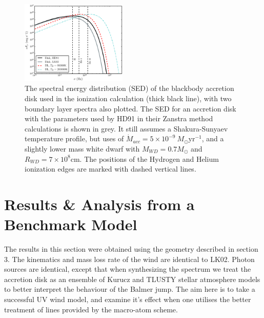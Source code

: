\documentclass[preprint, a4paper, 11pt]{aastex}
\begin{document}
\begin{figure}
\centering
\includegraphics[width=0.45\textwidth]{figures/sed_figure.eps}
\caption{
The spectral energy distribution (SED) of the blackbody accretion
disk used in the ionization calculation (thick black line), 
with two boundary layer spectra also plotted.
The SED for an accretion disk
with the parameters used by HD91 in their Zanstra method calculations is shown in grey. 
It still assumes a Shakura-Sunyaev temperature profile, but uses
of $\dot{M}_{acc}= 5\times10^{-9}~M_{\odot}$yr$^{-1}$, and a slightly lower mass
white dwarf with $M_{WD}=0.7 M_{\odot}$ and $R_{WD} = 7\times10^{8}$cm.
The positions of the Hydrogen and Helium ionization edges 
are marked with dashed vertical lines.
}
\label{sed}
\end{figure}


%



%

%
%

\section{Results \& Analysis from a Benchmark Model}

The results in this section were obtained using the geometry described
in section 3. The kinematics and mass loss rate of the wind are identical
to LK02. Photon sources are identical, except that when synthesizing the
spectrum we treat the accretion disk 
as an ensemble of Kurucz and TLUSTY stellar atmosphere models to better 
interpret the behaviour of the Balmer jump. The aim here is to 
take a successful UV wind model, and examine it's effect 
when one utilises the better treatment of lines provided
by the macro-atom scheme.
\end{document}
